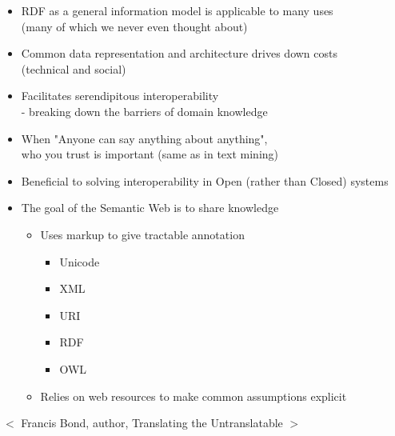 \documentclass[a4paper,landscape,headrule,footrule,xetex]{foils}
\begin{document}

\begin{itemize}
\item RDF as a general information model is applicable to many uses 
\\ (many of which we never even thought about)
\item Common data representation and architecture drives down costs
\\  (technical and social)
\item Facilitates serendipitous interoperability 
\\ - breaking down the barriers of domain knowledge
\item When "Anyone can say anything about anything", 
\\ who you trust is important (same as in text mining)

\item Beneficial to solving interoperability in Open (rather than Closed) systems

\end{itemize}

 

\begin{itemize}
\item The goal of the Semantic Web is to share knowledge
  \begin{itemize}
  \item Uses markup to give tractable annotation
    \begin{itemize}
    \item Unicode
    \item XML
    \item URI
    \item RDF
    \item OWL
    \end{itemize}
  \item Relies on web resources to make common assumptions explicit
\end{itemize}
\end{itemize}


\begin{center}
  $<$ Francis Bond, author, Translating the Untranslatable $>$
\end{center}
\end{document}
